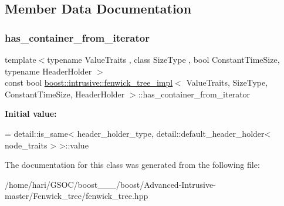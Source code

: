 \subsection{Member Data Documentation}
\mbox{\label{classboost_1_1intrusive_1_1fenwick__tree__impl_af34f6affb96b4eee4abd0e16c4c506dc}} 
\subsubsection{\texorpdfstring{has\+\_\+container\+\_\+from\+\_\+iterator}{has\_container\_from\_iterator}}
{\footnotesize\ttfamily template$<$typename Value\+Traits , class Size\+Type , bool Constant\+Time\+Size, typename Header\+Holder $>$ \\
const bool \hyperlink{classboost_1_1intrusive_1_1fenwick__tree__impl}{boost\+::intrusive\+::fenwick\+\_\+tree\+\_\+impl}$<$ Value\+Traits, Size\+Type, Constant\+Time\+Size, Header\+Holder $>$\+::has\+\_\+container\+\_\+from\+\_\+iterator\hspace{0.3cm}{\ttfamily [static]}}

{\bfseries Initial value\+:}
\begin{DoxyCode}
=
        detail::is\_same< header\_holder\_type, detail::default\_header\_holder< node\_traits > >::value
\end{DoxyCode}


The documentation for this class was generated from the following file\+:\begin{DoxyCompactItemize}
\item 
/home/hari/\+G\+S\+O\+C/boost\+\_\+\_\+\_/boost/\+Advanced-\/\+Intrusive-\/master/\+Fenwick\+\_\+tree/fenwick\+\_\+tree.\+hpp\end{DoxyCompactItemize}
